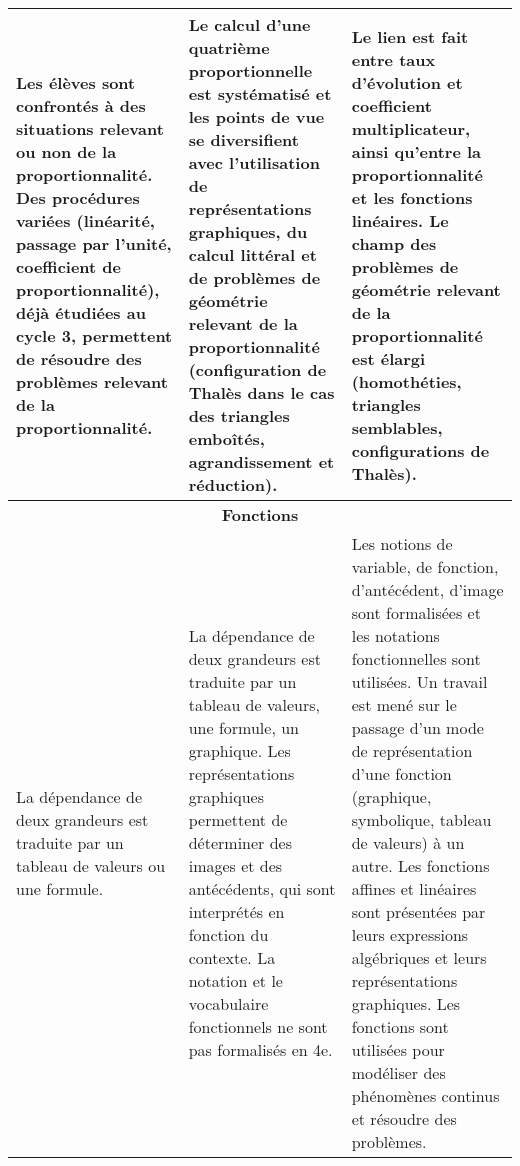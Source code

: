 \documentclass[11pt]{article}
\newcommand{\souscategorie}[1]{\hline\multicolumn{3}{|c|}{\color{bleu}\Large\bf\rmfamily\phantom{É}#1\phantom{É}\rmfamily}\\\hline}
\newenvironment{programme}
{
    \setlength{\arrayrulewidth}{0.5pt}
    \arrayrulecolor{bleu}
    \begin{center}
    \begin{tabular}{|p{6.4cm}|p{6.4cm}|p{6.4cm}|}
}
{
    \hline
    \end{tabular}
    \end{center}
}
\begin{document}
\begin{programme}
    Les élèves sont confrontés à des situations relevant ou non de la proportionnalité. Des procédures variées (linéarité, passage par l’unité, coefficient de proportionnalité), déjà étudiées au cycle 3, permettent de résoudre des problèmes relevant de la proportionnalité. & Le calcul d’une quatrième proportionnelle est systématisé et les points de vue se diversifient avec l’utilisation de représentations graphiques, du calcul littéral et de problèmes de géométrie relevant de la proportionnalité (configuration de Thalès dans le cas des triangles emboîtés, agrandissement et réduction). & Le lien est fait entre taux d’évolution et coefficient multiplicateur, ainsi qu’entre la proportionnalité et les fonctions linéaires. Le champ des problèmes de géométrie relevant de la proportionnalité est élargi (homothéties, triangles semblables, configurations de Thalès). \\
    \souscategorie{Fonctions}
    La dépendance de deux grandeurs est traduite par un tableau de valeurs ou une formule. & La dépendance de deux grandeurs est traduite par un tableau de valeurs, une formule, un graphique. Les représentations graphiques permettent de déterminer des images et des antécédents, qui sont interprétés en fonction du contexte. La notation et le vocabulaire fonctionnels ne sont pas formalisés en 4e. & Les notions de variable, de fonction, d’antécédent, d’image sont formalisées et les notations fonctionnelles sont utilisées. Un travail est mené sur le passage d’un mode de représentation d’une fonction (graphique, symbolique, tableau de valeurs) à un autre. Les fonctions affines et linéaires sont présentées par leurs expressions algébriques et leurs représentations graphiques. Les fonctions sont utilisées pour modéliser des phénomènes continus et résoudre des problèmes. \\
\end{programme}
\end{document}
